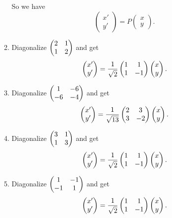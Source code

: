 \begin{enumerate}
\begin{enumerate}
So we have 
\[\begin{pmatrix}x'\\y'\end{pmatrix}=P\begin{pmatrix}x\\y\end{pmatrix}.\]
\item Diagonalize $\begin{pmatrix}2 & 1\cr 1 & 2\end{pmatrix}$ and get 
\[\begin{pmatrix}x'\\y'\end{pmatrix}=\frac{1}{\sqrt{2}}\begin{pmatrix}1 & 1\cr 1 & -1\end{pmatrix}\begin{pmatrix}x\\y\end{pmatrix}.\]
\item Diagonalize $\begin{pmatrix}1 & -6\cr -6 & -4\end{pmatrix}$ and get 
\[\begin{pmatrix}x'\\y'\end{pmatrix}=\frac{1}{\sqrt{13}}\begin{pmatrix}2 & 3\cr 3 & -2\end{pmatrix}\begin{pmatrix}x\\y\end{pmatrix}.\]
\item Diagonalize $\begin{pmatrix}3 & 1\cr 1 & 3\end{pmatrix}$ and get 
\[\begin{pmatrix}x'\\y'\end{pmatrix}=\frac{1}{\sqrt{2}}\begin{pmatrix}1 & 1\cr 1 & -1\end{pmatrix}\begin{pmatrix}x\\y\end{pmatrix}.\]
\item Diagonalize $\begin{pmatrix}1 & -1\cr -1 & 1\end{pmatrix}$ and get 
\[\begin{pmatrix}x'\\y'\end{pmatrix}=\frac{1}{\sqrt{2}}\begin{pmatrix}1 & 1\cr 1 & -1\end{pmatrix}\begin{pmatrix}x\\y\end{pmatrix}.\]

\end{enumerate}
\end{enumerate}
